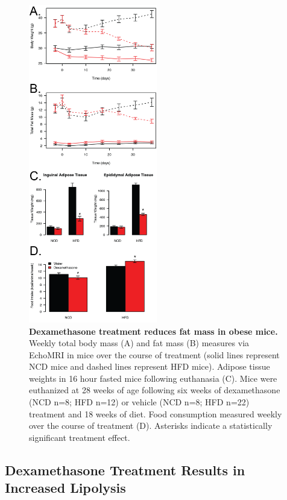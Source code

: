 \documentclass[11pt]{article} %
\begin{document}
\begin{figure}
  \begin{center}
    \includegraphics[width=0.5\textwidth]{Figures_Figure_3.png}
  \end{center}
  \caption{\textbf{Dexamethasone treatment reduces fat mass in obese mice.}  Weekly total body mass (A) and fat mass (B) measures via EchoMRI in mice over the course of treatment (solid lines represent NCD mice and dashed lines represent HFD mice). Adipose tissue weights in 16 hour fasted mice following euthanasia (C). Mice were euthanized at 28 weeks of age following six weeks of dexamethasone (NCD n=8; HFD n=12) or vehicle (NCD n=8; HFD n=22) treatment and 18 weeks of diet. Food consumption measured weekly over the course of treatment (D). Asterisks indicate a statistically significant treatment effect.
}
 \label{fig:3}
\end{figure}

\subsection*{Dexamethasone Treatment Results in Increased Lipolysis}
\end{document}
